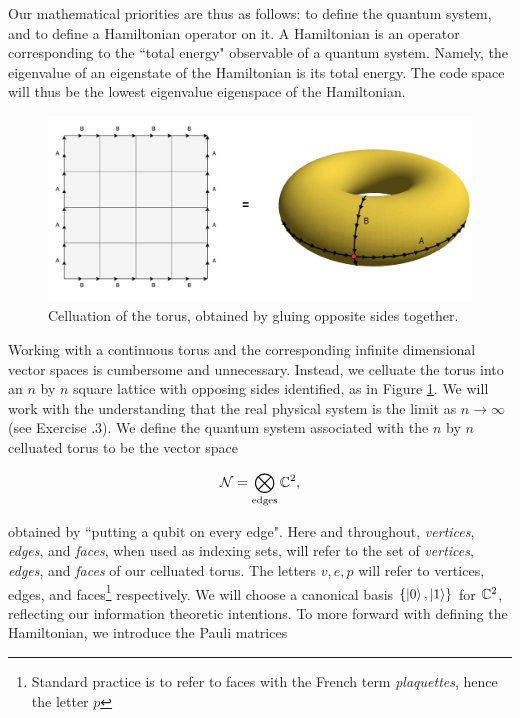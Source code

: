\documentclass{article}
\theoremstyle{definition}
\numberwithin{figure}{section}
\begin{document}
Our mathematical priorities are thus as follows: to define the quantum system, and to define a Hamiltonian operator on it. A Hamiltonian is an operator corresponding to the ``total energy" observable of a quantum system. Namely, the eigenvalue of an eigenstate of the Hamiltonian is its total energy. The code space will thus be the lowest eigenvalue eigenspace of the Hamiltonian.

\begin{figure}
\begin{center}
\includegraphics[scale=0.25]{torus}
\caption{Celluation of the torus, obtained by gluing opposite sides together.}
\label{fig:torus}
\end{center}
\end{figure}

Working with a continuous torus and the corresponding infinite dimensional vector spaces is cumbersome and unnecessary. Instead, we celluate the torus into an $n$ by $n$ square lattice with opposing sides identified, as in Figure \ref{fig:torus}. We will work with the understanding that the real physical system is the limit as $n\to\infty$ (see Exercise \thesection.3). We define the quantum system associated with the $n$ by $n$ celluated torus to be the vector space

$$\mathcal{N}=\bigotimes_{\text{edges}}\mathbb{C}^2,$$

obtained by ``putting a qubit on every edge". Here and throughout, \textit{vertices}, \textit{edges}, and \textit{faces}, when used as indexing sets, will refer to the set of \textit{vertices}, \textit{edges}, and \textit{faces} of our celluated torus. The letters $v,e,p$ will refer to vertices, edges, and faces\footnote{Standard practice is to refer to faces with the French term \textit{plaquettes}, hence the letter $p$} respectively. We will choose a canonical basis $\left\{\left|0\right>,\left|1\right>\right\}$ for $\mathbb{C}^2$, reflecting our information theoretic intentions. To more forward with defining the Hamiltonian, we introduce the Pauli matrices
\end{document}
